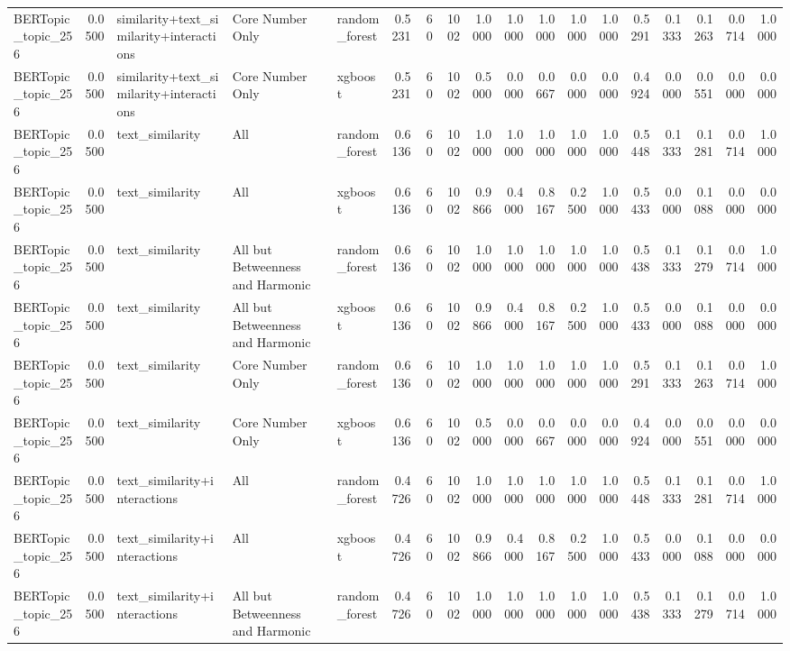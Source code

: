 \begin{tabular}{lrlllrrrrrrrrrrrrr}
BERTopic_topic_256 & 0.0500 & similarity+text_similarity+interactions & Core Number Only & random_forest & 0.5231 & 60 & 1002 & 1.0000 & 1.0000 & 1.0000 & 1.0000 & 1.0000 & 0.5291 & 0.1333 & 0.1263 & 0.0714 & 1.0000 \\
BERTopic_topic_256 & 0.0500 & similarity+text_similarity+interactions & Core Number Only & xgboost & 0.5231 & 60 & 1002 & 0.5000 & 0.0000 & 0.0667 & 0.0000 & 0.0000 & 0.4924 & 0.0000 & 0.0551 & 0.0000 & 0.0000 \\
BERTopic_topic_256 & 0.0500 & text_similarity & All & random_forest & 0.6136 & 60 & 1002 & 1.0000 & 1.0000 & 1.0000 & 1.0000 & 1.0000 & 0.5448 & 0.1333 & 0.1281 & 0.0714 & 1.0000 \\
BERTopic_topic_256 & 0.0500 & text_similarity & All & xgboost & 0.6136 & 60 & 1002 & 0.9866 & 0.4000 & 0.8167 & 0.2500 & 1.0000 & 0.5433 & 0.0000 & 0.1088 & 0.0000 & 0.0000 \\
BERTopic_topic_256 & 0.0500 & text_similarity & All but Betweenness and Harmonic & random_forest & 0.6136 & 60 & 1002 & 1.0000 & 1.0000 & 1.0000 & 1.0000 & 1.0000 & 0.5438 & 0.1333 & 0.1279 & 0.0714 & 1.0000 \\
BERTopic_topic_256 & 0.0500 & text_similarity & All but Betweenness and Harmonic & xgboost & 0.6136 & 60 & 1002 & 0.9866 & 0.4000 & 0.8167 & 0.2500 & 1.0000 & 0.5433 & 0.0000 & 0.1088 & 0.0000 & 0.0000 \\
BERTopic_topic_256 & 0.0500 & text_similarity & Core Number Only & random_forest & 0.6136 & 60 & 1002 & 1.0000 & 1.0000 & 1.0000 & 1.0000 & 1.0000 & 0.5291 & 0.1333 & 0.1263 & 0.0714 & 1.0000 \\
BERTopic_topic_256 & 0.0500 & text_similarity & Core Number Only & xgboost & 0.6136 & 60 & 1002 & 0.5000 & 0.0000 & 0.0667 & 0.0000 & 0.0000 & 0.4924 & 0.0000 & 0.0551 & 0.0000 & 0.0000 \\
BERTopic_topic_256 & 0.0500 & text_similarity+interactions & All & random_forest & 0.4726 & 60 & 1002 & 1.0000 & 1.0000 & 1.0000 & 1.0000 & 1.0000 & 0.5448 & 0.1333 & 0.1281 & 0.0714 & 1.0000 \\
BERTopic_topic_256 & 0.0500 & text_similarity+interactions & All & xgboost & 0.4726 & 60 & 1002 & 0.9866 & 0.4000 & 0.8167 & 0.2500 & 1.0000 & 0.5433 & 0.0000 & 0.1088 & 0.0000 & 0.0000 \\
BERTopic_topic_256 & 0.0500 & text_similarity+interactions & All but Betweenness and Harmonic & random_forest & 0.4726 & 60 & 1002 & 1.0000 & 1.0000 & 1.0000 & 1.0000 & 1.0000 & 0.5438 & 0.1333 & 0.1279 & 0.0714 & 1.0000 \\

\end{tabular}
